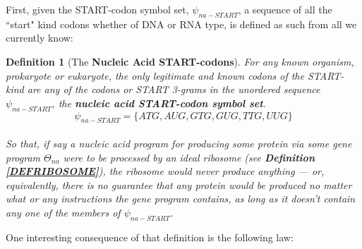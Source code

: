 \documentclass[a4paper, 18pt]{book} %
\newtheorem{defn}{Definition}
\newtheorem{law}{Law}
\begin{document}
First, given the START-codon symbol set, $\psi_{na-START}$, a sequence of all the ``start" kind codons whether of DNA or RNA type, is defined as such from all we currently know:

\begin{defn}[The \textbf{Nucleic Acid START-codons}]
\label{DEFSTARTCOD}
For any known organism, prokaryote or eukaryote, the only legitimate and known codons of the START-kind are any of the codons or START 3-grams in the unordered sequence $\psi_{na-START}$, the \textbf{nucleic acid START-codon symbol set}.\\

\begin{equation}
\label{EQNNASSS}
\psi_{na-START} = \{ATG,AUG,GTG,GUG,TTG,UUG\}
\end{equation}\\

So that, if say a nucleic acid program for producing some protein via some gene program $\Theta_{na}$ were to be processed by an ideal ribosome (see \textbf{Definition \ref{DEFRIBOSOME}}), the ribosome would never produce anything --- or, equivalently, there is no guarantee that any protein would be produced no matter what or any instructions the gene program contains, as long as it doesn't contain any one of the members of $\psi_{na-START}$.
\end{defn} 

One interesting consequence of that definition is the following law:\\

\begin{center}
\\
\end{center}
\end{document}
